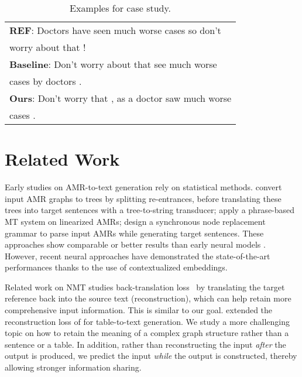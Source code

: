 \documentclass[11pt,a4paper]{article}
\begin{document}
\begin{table}[!htbp]
{\begin{tabular}{l}
			\textbf{REF}: Doctors have seen much worse cases so don't \\ worry about that ! \\ 
			\textbf{Baseline}: Don't worry about that {\color{red} see much worse} \\
			{\color{red} cases by doctors} . \\
			\textbf{Ours}: Don't worry that , {\color{green} as } a {\color{blue} doctor saw much worse} \\ 
			{\color{blue} cases} . \\
			\bottomrule
		\end{tabular}
	}
	\caption{\label{tab:case} Examples for case study.}
\end{table}



\section{Related Work}

Early studies on AMR-to-text generation rely on statistical methods. \citet{flanigan2016generation} convert input AMR graphs to trees by splitting re-entrances, before translating these trees into target sentences with a tree-to-string  transducer;
\citet{pourdamghani2016generating} apply a phrase-based MT system on linearized AMRs; \citet{song2017amr} design a synchronous node replacement grammar to parse input AMRs while generating target sentences.
These approaches show comparable or better results than early neural models \cite{konstas2017neural}.
However, recent neural approaches \cite{song2018graph, zhu2019modeling,cai2020graph,wang2020amr,mager-etal-2020-gpt} have demonstrated the state-of-the-art  performances thanks to the use of contextualized embeddings.





Related work on NMT studies back-translation loss~\cite{sennrich2016improving,tu2017neural} by translating the target reference back into the source text (reconstruction), which can help retain more comprehensive input information. This is similar to our goal.
\citet{wiseman2017challenges} extended 
the reconstruction loss of 
\citet{tu2017neural} for table-to-text generation.
We study a more challenging topic on how to retain the meaning of a complex graph structure rather than a sentence or a table.
In addition, rather than reconstructing the input \textit{after} the output is produced, we predict the input \textit{while} the output is constructed, thereby allowing stronger information sharing.
\end{document}
